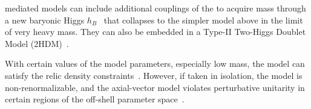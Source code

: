 
\Zprime mediated models can include additional couplings of the \Zprime to acquire mass through a new baryonic Higgs $h_B$~\cite{Berlin:2014cfa} that collapses to the simpler model above in the limit of very heavy \Zprime mass. 
They can also be embedded in a Type-II Two-Higgs Doublet Model (2HDM)~\cite{Berlin:2014cfa}.%

With certain values of the model parameters, especially low \Zprime mass,
the model can satisfy the relic density constraints~\cite{Chala:2015ama}.
However, if taken in isolation, the model is non-renormalizable, and the axial-vector
model violates perturbative unitarity in certain regions of the off-shell parameter space~\cite{Chala:2015ama,Kahlhoefer:2015bea,Boveia:2016mrp}. 



